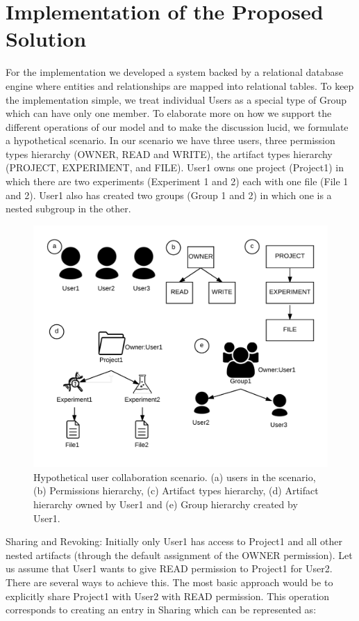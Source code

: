 \documentclass[sigconf]{acmart}
\begin{document}
\section{Implementation of the Proposed Solution}
For the implementation we developed a system backed by a relational database engine where entities and relationships are mapped into relational tables. To keep the implementation simple, we treat individual Users as a special type of Group which can have only one member. To elaborate more on how we support the different operations of our model and to make the discussion lucid, we formulate a hypothetical scenario. In our scenario we have three users, three permission types hierarchy (OWNER, READ and WRITE), the artifact types hierarchy (PROJECT, EXPERIMENT, and FILE). User1 owns one project (Project1) in which there are two experiments (Experiment 1 and 2) each with one file (File 1 and 2). User1 also has created two groups (Group 1 and 2) in which one is a nested subgroup in the other.

\begin{figure}
\includegraphics[width=\columnwidth]{figures/usage-scenarios.pdf}
\caption{Hypothetical user collaboration scenario. (a) users in the scenario, (b) Permissions hierarchy, (c) Artifact types hierarchy, (d) Artifact hierarchy owned by User1 and (e) Group hierarchy created by User1.}
\end{figure}

Sharing and Revoking: Initially only User1 has access to Project1 and all other nested artifacts (through the default assignment of the OWNER permission). Let us assume that User1 wants to give READ permission to Project1 for User2.  There are several ways to achieve this. The most basic approach would be to explicitly share Project1 with User2 with READ permission. This operation corresponds to creating an entry in Sharing which can be represented as:
\end{document}
